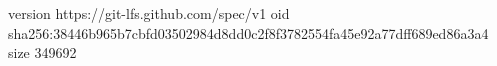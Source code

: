 version https://git-lfs.github.com/spec/v1
oid sha256:38446b965b7cbfd03502984d8dd0c2f8f3782554fa45e92a77dff689ed86a3a4
size 349692
